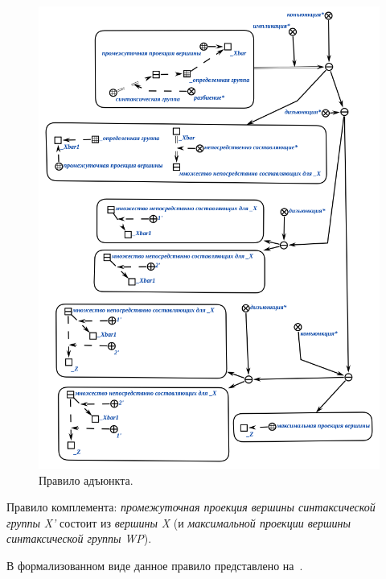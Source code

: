 \begin{figure}[h]
    \centering
    \includegraphics[scale=0.8]{images/part2/chapter_lang/adjunct_rule}
    \caption{Правило адъюнкта.}
    \label{fig:adjunct_rule}
\end{figure}

Правило комплемента: \textit{промежуточная проекция вершины синтаксической группы}  \textit{X'} состоит из \textit{вершины} \textit{X} (и \textit{максимальной проекции вершины синтаксической группы} \textit{WP}).

В формализованном виде данное правило представлено на~\textit{}.

